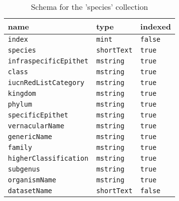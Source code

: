 \begin{table}[H]
  \caption{Schema for the 'species' collection}
  \label{tab:species-schema}
  \begin{tabular}{lll}
    \toprule
    name & type & indexed \\
    \midrule
    \texttt{index} & \texttt{mint} & \texttt{false} \\
    \texttt{species} & \texttt{shortText} & \texttt{true} \\
    \texttt{infraspecificEpithet} & \texttt{mstring} & \texttt{true} \\
    \texttt{class} & \texttt{mstring} & \texttt{true} \\
    \texttt{iucnRedListCategory} & \texttt{mstring} & \texttt{true} \\
    \texttt{kingdom} & \texttt{mstring} & \texttt{true} \\
    \texttt{phylum} & \texttt{mstring} & \texttt{true} \\
    \texttt{specificEpithet} & \texttt{mstring} & \texttt{true} \\
    \texttt{vernacularName} & \texttt{mstring} & \texttt{true} \\
    \texttt{genericName} & \texttt{mstring} & \texttt{true} \\
    \texttt{family} & \texttt{mstring} & \texttt{true} \\
    \texttt{higherClassification} & \texttt{mstring} & \texttt{true} \\
    \texttt{subgenus} & \texttt{mstring} & \texttt{true} \\
    \texttt{organismName} & \texttt{mstring} & \texttt{true} \\
    \texttt{datasetName} & \texttt{shortText} & \texttt{false} \\
    \bottomrule
  \end{tabular}
\end{table}
